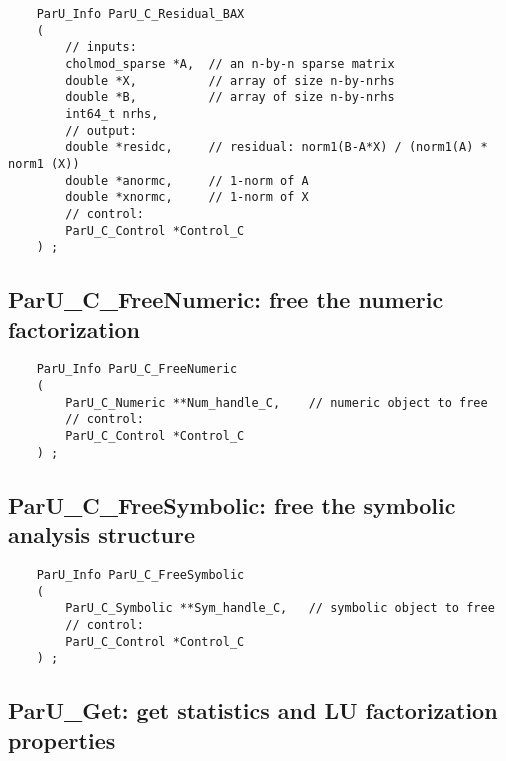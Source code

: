 \documentclass[12pt]{article}
\begin{document}
    {\footnotesize
    \begin{verbatim}
    ParU_Info ParU_C_Residual_BAX
    (
        // inputs:
        cholmod_sparse *A,  // an n-by-n sparse matrix
        double *X,          // array of size n-by-nrhs
        double *B,          // array of size n-by-nrhs
        int64_t nrhs,
        // output:
        double *residc,     // residual: norm1(B-A*X) / (norm1(A) * norm1 (X))
        double *anormc,     // 1-norm of A
        double *xnormc,     // 1-norm of X
        // control:
        ParU_C_Control *Control_C
    ) ; \end{verbatim} }

\subsection{{\sf ParU\_C\_FreeNumeric}: free the numeric factorization}

    {\footnotesize
    \begin{verbatim}
    ParU_Info ParU_C_FreeNumeric
    (
        ParU_C_Numeric **Num_handle_C,    // numeric object to free
        // control:
        ParU_C_Control *Control_C
    ) ; \end{verbatim} }

\subsection{{\sf ParU\_C\_FreeSymbolic}: free the symbolic analysis structure}

    {\footnotesize
    \begin{verbatim}
    ParU_Info ParU_C_FreeSymbolic
    (
        ParU_C_Symbolic **Sym_handle_C,   // symbolic object to free
        // control:
        ParU_C_Control *Control_C
    ) ; \end{verbatim} }

\subsection{{\sf ParU\_Get}: get statistics and LU factorization properties}
\end{document}
